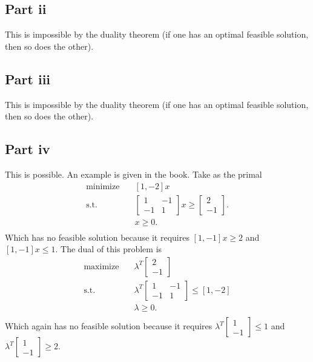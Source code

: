 \documentclass{article}
\begin{document}
\subsection*{Part ii}
This is impossible by the duality theorem (if one has an optimal feasible
solution, then so does the other).
\subsection*{Part iii}
This is impossible by the duality theorem (if one has an optimal feasible
solution, then so does the other).
\subsection*{Part iv}
This is possible. An example is given in the book. Take as the primal
\[
\begin{aligned}
	\text{minimize}\quad & [1,-2]x\\
\textrm{s.t.} \quad &\begin{bmatrix}
	1 & -1\\
	-1 & 1
\end{bmatrix}x\geq \begin{bmatrix}
2\\	
-1
\end{bmatrix}.\\
	      \quad &x\geq 0.\\
\end{aligned}
\]
Which has no feasible solution because it requires $[1,-1]x\geq 2$ and
$[1,-1]x\leq 1$. The dual of this problem is
\[
\begin{aligned}
	\text{maximize}\quad & \lambda^T\begin{bmatrix}
	2\\	
	-1
	\end{bmatrix}\\
\textrm{s.t.} \quad &\lambda^T\begin{bmatrix}
	1 & -1\\
	-1 & 1
	\end{bmatrix}\leq [1,-2]\\
	      \quad &\lambda\geq 0.\\
\end{aligned}
\]
Which again has no feasible solution because it requires $\lambda^T\begin{bmatrix}
1\\
-1
\end{bmatrix}\leq 1$ and $\lambda^T\begin{bmatrix}
1\\
-1
\end{bmatrix}\geq 2$.
\end{document}
